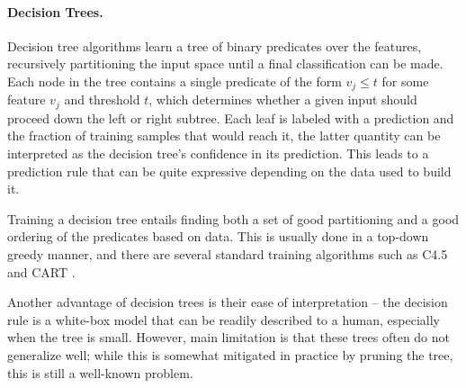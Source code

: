 \paragraph{Decision Trees.} Decision tree algorithms learn a tree of binary predicates over the features, recursively partitioning the input space until a final
classification can be made. Each node in the tree contains a single predicate of the form
$v_j \leq t$ for some feature $v_j$ and threshold $t$, which determines
whether a given input should proceed down the left or right subtree.
Each leaf is labeled with a prediction and the fraction of training
samples that would reach it, the latter quantity can be interpreted as
the decision tree's confidence in its prediction. This leads to a prediction rule
that can be quite expressive depending on the data used to build it.

Training a decision tree entails finding both a set of good partitioning and a good ordering of the predicates based on data. This is usually done in a top-down greedy manner, and there are several standard training algorithms such as C4.5
\citep{Quinlan1993-de} and CART \citep{Breiman1984-qy}.

Another advantage of decision trees is their ease of interpretation --  the decision rule is a white-box model that can be readily described to a human, especially when the tree is small. However, main limitation is that these trees often do not generalize well; while this is somewhat mitigated in practice by pruning the tree, this is still a well-known problem.


%
%
%

%
%


